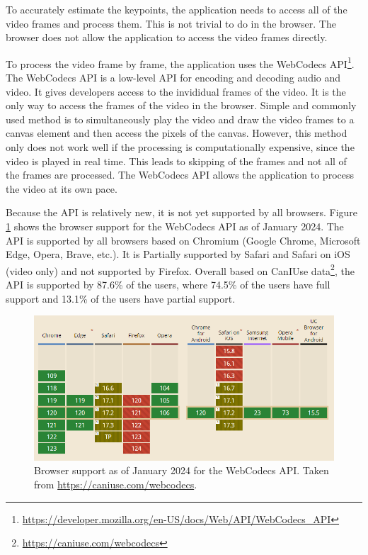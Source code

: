 To accurately estimate the keypoints, the application needs to access all of the video frames and process them. This is not trivial to do in the browser. The browser does not allow the application to access the video frames directly.

To process the video frame by frame, the application uses the WebCodecs API\footnote{\url{https://developer.mozilla.org/en-US/docs/Web/API/WebCodecs_API}}. The WebCodecs API is a low-level API for encoding and decoding audio and video. It gives developers access to the invididual frames of the video. It is the only way to access the frames of the video in the browser. Simple and commonly used method is to simultaneously play the video and draw the video  frames to a canvas element and then access the pixels of the canvas. However, this method only does not work well if the processing is computationally expensive, since the video is played in real time. This leads to skipping of the frames and not all of the frames are processed. The WebCodecs API allows the application to process the video at its own pace.

Because the API is relatively new, it is not yet supported by all browsers. Figure \ref{fig:caniuseWebcodecs} shows the browser support for the WebCodecs API as of January 2024. The API is supported by all browsers based on Chromium (Google Chrome, Microsoft Edge, Opera, Brave, etc.). It is Partially supported by Safari and Safari on iOS (video only) and not supported by Firefox. Overall based on CanIUse data\footnote{\url{https://caniuse.com/webcodecs}}, the API is supported by 87.6\% of the users, where 74.5\% of the users have full support and 13.1\% of the users have partial support.


\begin{figure}[htbp]
    \centering
    \includegraphics[width=\textwidth]{obrazky-figures/caniuseWebcodecs.png}
    \caption{Browser support as of January 2024 for the WebCodecs API. Taken from \url{https://caniuse.com/webcodecs}.}
    \label{fig:caniuseWebcodecs}
\end{figure}

